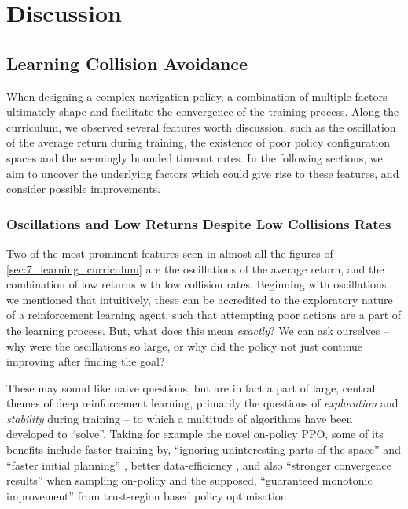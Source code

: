 \chapter{Discussion}
\label{chap:9_discussion}


\section{Learning Collision Avoidance}
When designing a complex navigation policy, a combination of multiple factors ultimately shape and facilitate the convergence of the training process. Along the curriculum, we observed several features worth discussion, such as the oscillation of the average return during training, the existence of poor policy configuration spaces and the seemingly bounded timeout rates. 
In the following sections, we aim to uncover the underlying factors which could give rise to these features, and consider possible improvements.

\subsection{Oscillations and Low Returns Despite Low Collisions Rates}
Two of the most prominent features seen in almost all the figures of \cref{sec:7_learning_curriculum} are the oscillations of the average return, and the combination of low returns with low collision rates. Beginning with oscillations, we mentioned that intuitively, these can be accredited to the exploratory nature of a reinforcement learning agent, such that attempting poor actions are a part of the learning process. But, what does this mean \textit{exactly}? We can ask ourselves -- why were the oscillations so large, or why did the policy not just continue improving after finding the goal? 

These may sound like naive questions, but are in fact a part of large, central themes of deep reinforcement learning, primarily the questions of \textit{exploration} and \textit{stability} during training -- to which a multitude of algorithms have been developed to ``solve''. Taking for example the novel on-policy PPO, some of its benefits include faster training by, ``ignoring uninteresting parts of the space'' and ``faster initial planning'' \cite{suttonAndBartoBook}, better data-efficiency \cite{PPO}, and also  ``stronger convergence results'' when sampling on-policy \cite{suttonAndBartoBook} and the supposed, ``guaranteed monotonic improvement'' from trust-region based policy optimisation \cite{TRPO}.

